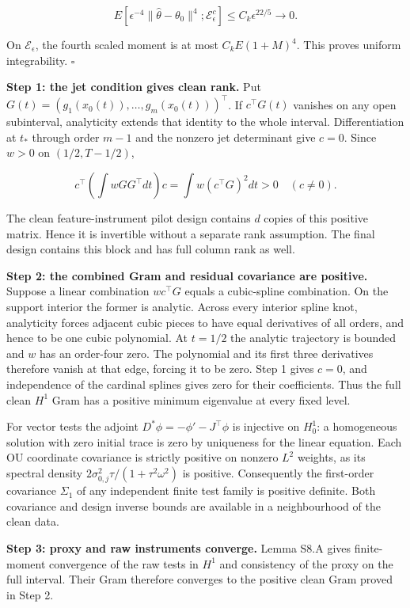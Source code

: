 \documentclass[
  american,
  11pt,
]{article}
\begin{document}
\[
E[\epsilon^{-4}\|\widehat\theta-\theta_0\|^4;
\mathcal E_\epsilon^c]\leq C_k\epsilon^{22/5}\to0.
\]

On \(\mathcal E_\epsilon\), the fourth scaled moment is at most
\(C_kE(1+M)^4\). This proves uniform integrability. \(\square\)

\textbf{Step 1: the jet condition gives clean rank.} Put
\(G(t)=(g_1(x_0(t)),\ldots,g_m(x_0(t)))^\top\). If \(c^\top G(t)\)
vanishes on any open subinterval, analyticity extends that identity to
the whole interval. Differentiation at \(t_*\) through order \(m-1\) and
the nonzero jet determinant give \(c=0\). Since \(w>0\) on
\((1/2,T-1/2)\),

\[
c^\top\left(\int wGG^\top dt\right)c
=\int w(c^\top G)^2dt>0\quad(c\ne0).
\]

The clean feature-instrument pilot design contains \(d\) copies of this
positive matrix. Hence it is invertible without a separate rank
assumption. The final design contains this block and has full column
rank as well.

\textbf{Step 2: the combined Gram and residual covariance are positive.}
Suppose a linear combination \(w c^\top G\) equals a cubic-spline
combination. On the support interior the former is analytic. Across
every interior spline knot, analyticity forces adjacent cubic pieces to
have equal derivatives of all orders, and hence to be one cubic
polynomial. At \(t=1/2\) the analytic trajectory is bounded and \(w\)
has an order-four zero. The polynomial and its first three derivatives
therefore vanish at that edge, forcing it to be zero. Step 1 gives
\(c=0\), and independence of the cardinal splines gives zero for their
coefficients. Thus the full clean \(H^1\) Gram has a positive minimum
eigenvalue at every fixed level.

For vector tests the adjoint \(D^*\phi=-\phi'-J^\top\phi\) is injective
on \(H_0^1\): a homogeneous solution with zero initial trace is zero by
uniqueness for the linear equation. Each OU coordinate covariance is
strictly positive on nonzero \(L^2\) weights, as its spectral density
\(2\sigma_{0,j}^2\tau/(1+\tau^2\omega^2)\) is positive. Consequently the
first-order covariance \(\Sigma_1\) of any independent finite test
family is positive definite. Both covariance and design inverse bounds
are available in a neighbourhood of the clean data.

\textbf{Step 3: proxy and raw instruments converge.} Lemma S8.A gives
finite-moment convergence of the raw tests in \(H^1\) and consistency of
the proxy on the full interval. Their Gram therefore converges to the
positive clean Gram proved in Step 2.
\end{document}
